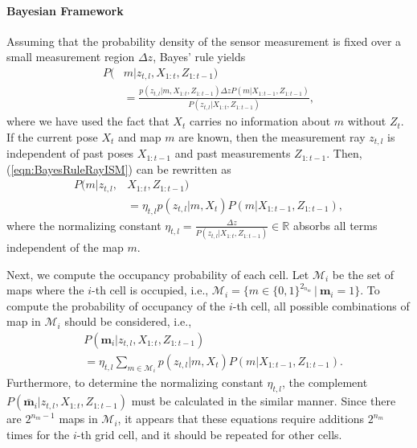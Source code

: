 \documentclass[letterpaper, 10pt, conference]{ieeeconf}
\newcommand{\refeqn}[1]{(\ref{eqn:#1})}
\renewcommand{\Re}{\ensuremath{\mathbb{R}}}
\newcommand{\EditTL}[1]{{\color{red}\protect #1}}
\begin{document}
\paragraph{Bayesian Framework}
Assuming that the probability density of the sensor measurement is fixed over a small measurement region $\Delta z$, Bayes' rule yields
\begin{align}
\label{eqn:BayesRuleRayISM}
P(&m|z_{t,l},X_{1:t},Z_{1:t-1})\nonumber
\\
&=\frac{p(z_{t,l}|m,X_{1:t},Z_{1:t-1})\Delta zP(m|X_{1:t-1},Z_{1:t-1})}{P(z_{t,l}|X_{1:t},Z_{1:t-1})},
\end{align}
where we have used the fact that $X_t$ carries no information about $m$ without $Z_t$.
If the current pose $X_t$ and map $m$ are known, then the measurement ray $z_{t,l}$ is independent of past poses $X_{1:t-1}$ and past measurements $Z_{1:t-1}$.
Then, \refeqn{BayesRuleRayISM} can be rewritten as
\begin{align}
P(m|z_{t,l},&X_{1:t},Z_{1:t-1})\nonumber
\\
&
=\eta_{t,l}p(z_{t,l}|m,X_{t})P(m|X_{1:t-1},Z_{1:t-1}),
\end{align}
where the normalizing constant $\eta_{t,l}=\frac{\Delta z}{P(z_{t,l}|X_{1:t},Z_{1:t-1})}\in\Re$ absorbs all terms independent of the map $m$.


Next, we compute the occupancy probability of each cell. Let $\mathcal{M}_i$ be the set of maps where the $i$-th cell is occupied, i.e., $\mathcal{M}_i =\{m\in\{0,1\}^{2_{n_m}}\,|\ \mathbf{m}_i=1\}$. To compute the probability of occupancy of the $i$-th cell, all possible combinations of map in $\mathcal{M}_i$ should be considered, i.e., 
\begin{align}
\label{eqn:InvSenModWithProbDens}
&P(\mathbf{m}_i|z_{t,l},X_{1:t},Z_{1:t-1})\nonumber
\\
&=\eta_{t,l}\sum_{m\in\mathcal{M}_i}p(z_{t,l}|m,X_{t})P(m|X_{1:t-1},Z_{1:t-1}).
\end{align}
Furthermore, to determine the normalizing constant $\eta_{t,l}$, the complement $P(\bar{\mathbf{m}}_i|z_{t,l},X_{1:t},Z_{1:t-1})$ must be calculated in the similar manner. Since there are $2^{n_{m}-1}$ maps in $\mathcal{M}_i$, it appears that these equations require additions $2^{n_m}$ times for the $i$-th grid cell, and it should be repeated for other cells.
	
\end{document}
